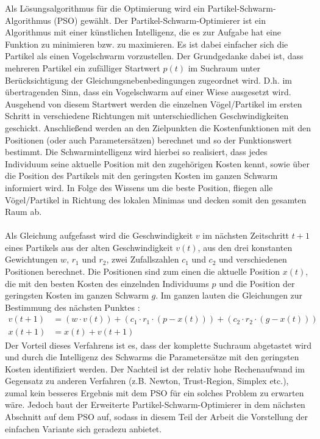 Als Lösungsalgorithmus für die Optimierung wird ein Partikel-Schwarm-Algorithmus (PSO) gewählt. Der Partikel-Schwarm-Optimierer ist ein Algorithmus mit einer künstlichen Intelligenz, die es zur Aufgabe hat eine Funktion zu minimieren bzw. zu maximieren. Es ist dabei einfacher sich die Partikel als einen Vogelschwarm vorzustellen. Der Grundgedanke dabei ist, dass mehreren Partikel ein zufälliger Startwert $p\left( t \right)$ im Suchraum unter Berücksichtigung der Gleichungsnebenbedingungen zugeordnet wird. D.h. im übertragenden Sinn, dass ein Vogelschwarm auf einer Wiese ausgesetzt wird. Ausgehend von diesem Startwert werden die einzelnen Vögel/Partikel im ersten Schritt in verschiedene Richtungen mit unterschiedlichen Geschwindigkeiten geschickt. Anschließend werden an den Zielpunkten die Kostenfunktionen mit den Positionen (oder auch Parametersätzen) berechnet und so der Funktionswert bestimmt. Die Schwarmintelligenz wird hierbei so realisiert, dass jedes Individuum seine aktuelle Position mit den zugehörigen Kosten kennt, sowie über die Position des Partikels mit den geringsten Kosten im ganzen Schwarm informiert wird. In Folge des Wissens um die beste Position, fliegen alle Vögel/Partikel in Richtung des lokalen Minimas und decken somit den gesamten Raum ab. \\ \\
Als Gleichung aufgefasst wird die Geschwindigkeit $v$ im nächsten Zeitschritt $t+1$ eines Partikels aus der alten Geschwindigkeit $v\left( t \right)$, aus den drei konstanten Gewichtungen $w$, $r_1$ und $r_2$, zwei Zufallszahlen $c_1$ und $c_2$ und verschiedenen Positionen berechnet. Die Positionen sind zum einen die aktuelle Position $x\left( t \right)$, die mit den besten Kosten des einzelnden Individuums $p$ und die Position der geringsten Kosten im ganzen Schwarm $g$. Im ganzen lauten die Gleichungen zur Bestimmung des nächsten Punktes \cite{PSO}:
\begin{align}
v\left( t+1 \right)&=\left( w\cdot v\left( t \right) \right) + \left( c_1\cdot r_1\cdot \left( p - x\left( t \right) \right) \right) + \left( c_2\cdot r_2\cdot \left( g - x\left( t \right) \right) \right) \\
x\left( t+1 \right)&=x\left( t \right) + v\left( t+1 \right)
\end{align}
Der Vorteil dieses Verfahrens ist es, dass der komplette Suchraum abgetastet wird und durch die Intelligenz des Schwarms die Parametersätze mit den geringsten Kosten identifiziert werden. Der Nachteil ist der relativ hohe Rechenaufwand im Gegensatz zu anderen Verfahren (z.B. Newton, Trust-Region, Simplex etc.), zumal kein besseres Ergebnis mit dem PSO für ein solches Problem zu erwarten wäre. Jedoch baut der Erweiterte Partikel-Schwarm-Optimierer in dem nächsten Abschnitt auf dem PSO auf, sodass in diesem Teil der Arbeit die Vorstellung der einfachen Variante sich geradezu anbietet.\\ \\

